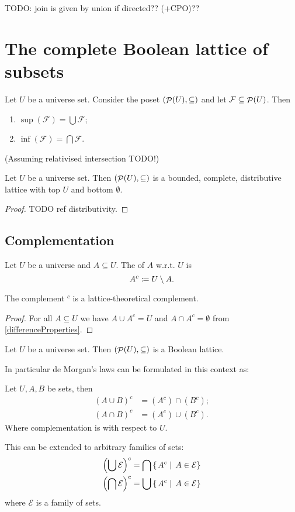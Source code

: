 TODO: join is given by union if directed?? (+CPO)??

\section{The complete Boolean lattice of subsets}
\begin{lemma}
Let $U$ be a universe set. Consider the poset $\left( \mathop{\mathcal{P}}(U), \subseteq \right)$ and let $\mathcal{F}\subseteq \mathop{\mathcal{P}}(U)$. Then
\begin{enumerate}
\item $\sup(\mathcal{F}) = \bigcup \mathcal{F}$;
\item $\inf(\mathcal{F}) = \bigcap \mathcal{F}$.
\end{enumerate}
(Assuming relativised intersection TODO!)
\end{lemma}
\begin{corollary}
Let $U$ be a universe set. Then $\left( \mathop{\mathcal{P}}(U), \subseteq \right)$ is a bounded, complete, distributive lattice with top $U$ and bottom $\emptyset$.
\end{corollary}
\begin{proof}
TODO ref distributivity.
\end{proof}

\subsection{Complementation}
\begin{definition}
Let $U$ be a universe and $A\subseteq U$. The  of $A$ w.r.t. $U$ is
\[ A^c \coloneqq U\setminus A. \]
\end{definition}

\begin{lemma}
The complement $^c$ is a lattice-theoretical complement.
\end{lemma}
\begin{proof}
For all $A\subseteq U$ we have $A\cup A^c = U$ and $A\cap A^c = \emptyset$ from \ref{differenceProperties}.
\end{proof}
\begin{corollary}
Let $U$ be a universe set. Then $\left( \mathop{\mathcal{P}}(U), \subseteq \right)$ is a Boolean lattice.
\end{corollary}

In particular de Morgan's laws can be formulated in this context as:
\begin{proposition}
Let $U,A,B$ be sets, then
\begin{align*}
(A\cup B)^c &= (A^c)\cap (B^c); \\
(A\cap B)^c &= (A^c)\cup (B^c).
\end{align*}
Where complementation is with respect to $U$.

This can be extended to arbitrary families of sets:
\begin{align*}
\left(\bigcup \mathcal{E}\right)^c &= \bigcap\left\{\left. A^c \;\right|\; A\in\mathcal{E} \right\} \\
\left(\bigcap \mathcal{E}\right)^c &= \bigcup\left\{\left. A^c \;\right|\; A\in\mathcal{E} \right\}
\end{align*}
where $\mathcal{E}$ is a family of sets.
\end{proposition}

